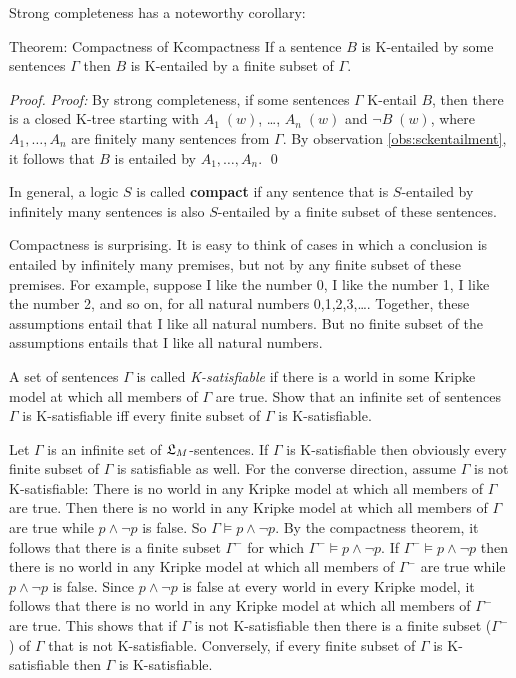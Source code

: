 Strong completeness has a noteworthy corollary:
%
\begin{theorem}{Theorem: Compactness of K}{compactness}
  If a sentence $B$ is K-entailed by some sentences $\Gamma$ then $B$ is
  K-entailed by a finite subset of $\Gamma$.
\end{theorem}
\begin{proof}
  \emph{Proof:} By strong completeness, if some sentences $\Gamma$ K-entail $B$,
  then there is a closed K-tree starting with $A_{1}\; (w)$, \ldots,
  $A_{n}\; (w)$ and $\neg B\; (w)$, where $A_{1},\ldots,A_{n}$ are finitely many
  sentences from $\Gamma$. By observation \ref{obs:sckentailment}, it follows
  that $B$ is entailed by $A_{1},\ldots,A_{n}$. \qed
\end{proof}

In general, a logic $S$ is called \textbf{compact} if any sentence that is
$S$-entailed by infinitely many sentences is also $S$-entailed by a
finite subset of these sentences.

Compactness is surprising. It is easy to think of cases in which a conclusion is
entailed by infinitely many premises, but not by any finite subset of these
premises. For example, suppose I like the number 0, I like the number 1, I like
the number 2, and so on, for all natural numbers 0,1,2,3,\ldots. Together, these
assumptions entail that I like all natural numbers. But no finite subset of the
assumptions entails that I like all natural numbers.

\begin{exercise}
  A set of sentences $\Gamma$ is called \emph{K-satisfiable} if there is a world
  in some Kripke model at which all members of $\Gamma$ are true. Show that an
  infinite set of sentences $\Gamma$ is K-satisfiable iff every finite subset of
  $\Gamma$ is K-satisfiable.
\end{exercise}
\begin{solution}
  Let $\Gamma$ is an infinite set of $\mathfrak{L}_{M}$-sentences. If $\Gamma$ is
  K-satisfiable then obviously every finite subset of $\Gamma$ is satisfiable as
  well. For the converse direction, assume $\Gamma$ is not K-satisfiable: There
  is no world in any Kripke model at which all members of $\Gamma$ are true.
  Then there is no world in any Kripke model at which all members of $\Gamma$
  are true while $p \land \neg p$ is false. So $\Gamma \models p\land \neg p$.
  By the compactness theorem, it follows that there is a finite subset
  $\Gamma^{-}$ for which $\Gamma^{-} \models p \land \neg p$. If
  $\Gamma^{-} \models p \land \neg p$ then there is no world in any Kripke model
  at which all members of $\Gamma^{-}$ are true while $p \land \neg p$ is false.
  Since $p\land \neg p$ is false at every world in every Kripke model, it
  follows that there is no world in any Kripke model at which all members of
  $\Gamma^{-}$ are true. This shows that if $\Gamma$ is not K-satisfiable then
  there is a finite subset ($\Gamma^{-}$) of $\Gamma$ that is not K-satisfiable.
  Conversely, if every finite subset of $\Gamma$ is K-satisfiable then $\Gamma$
  is K-satisfiable.
\end{solution}

